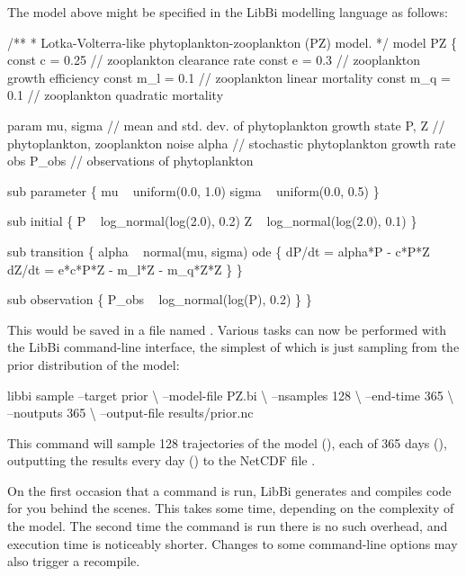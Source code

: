 The model above might be specified in the LibBi modelling language as follows:
\begin{bicode}
/**
 * Lotka-Volterra-like phytoplankton-zooplankton (PZ) model.
 */
model PZ \{
  const c = 0.25   // zooplankton clearance rate
  const e = 0.3    // zooplankton growth efficiency
  const m_l = 0.1  // zooplankton linear mortality
  const m_q = 0.1  // zooplankton quadratic mortality

  param mu, sigma  // mean and std. dev. of phytoplankton growth
  state P, Z       // phytoplankton, zooplankton
  noise alpha      // stochastic phytoplankton growth rate
  obs P_obs        // observations of phytoplankton
  
  sub parameter \{
    mu ~ uniform(0.0, 1.0)
    sigma ~ uniform(0.0, 0.5)
  \}
  
  sub initial \{
    P ~ log_normal(log(2.0), 0.2)
    Z ~ log_normal(log(2.0), 0.1)
  \}

  sub transition \{
    alpha ~ normal(mu, sigma)
    ode \{
      dP/dt = alpha*P - c*P*Z
      dZ/dt = e*c*P*Z - m_l*Z - m_q*Z*Z
    \}
  \}

  sub observation \{
    P_obs ~ log_normal(log(P), 0.2)
  \}
\}
\end{bicode}

This would be saved in a file named . Various tasks can now be
performed with the LibBi command-line interface, the simplest of which is
just sampling from the prior distribution of the model:
\begin{cmdcode}
libbi sample --target prior \textbackslash
    --model-file PZ.bi \textbackslash
    --nsamples 128 \textbackslash
    --end-time 365 \textbackslash
    --noutputs 365 \textbackslash
    --output-file results/prior.nc
\end{cmdcode}
This command will sample 128 trajectories of the model (), each of 365 days (), outputting the results
every day () to the NetCDF file
.

\begin{tip}
On the first occasion that a command is run, LibBi generates and compiles code
for you behind the scenes. This takes some time, depending on the complexity
of the model. The second time the command is run there is no such overhead,
and execution time is noticeably shorter. Changes to some command-line options
may also trigger a recompile.
\end{tip}

